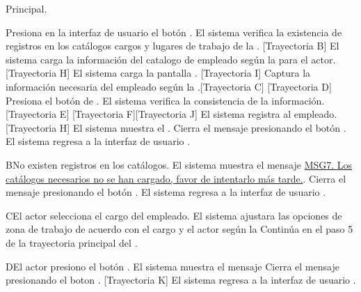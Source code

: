 \begin{UCtrayectoria}{Principal.}
	
	\UCpaso[\UCactor] Presiona en la interfaz de usuario  el botón \IUbutton{+}.
	\UCpaso  El sistema verifica la existencia de registros en los catálogos cargos  y  lugares de trabajo de la  . [Trayectoria B] 
	\UCpaso El sistema carga la información del catalogo de empleado  según la  para el actor. [Trayectoria H]
	\UCpaso El sistema carga la pantalla  . [Trayectoria I]
	\UCpaso[\UCactor] Captura la información necesaria del empleado según la  .[Trayectoria C] [Trayectoria D] 
	\UCpaso[\UCactor]  Presiona el botón de .
	\UCpaso El sistema verifica la consistencia de la información. [Trayectoria E] [Trayectoria F][Trayectoria J]
	\UCpaso El sistema registra al empleado. [Trayectoria H]
	\UCpaso  El sistema muestra el .    
	\UCpaso[\UCactor] Cierra el mensaje presionando el botón .
	\UCpaso El sistema regresa a la interfaz de usuario .
\end{UCtrayectoria}


\begin{UCtrayectoriaA}{B}{No existen registros en los catálogos.}
	\UCpaso El sistema muestra el mensaje \hyperref[MSG7]{MSG7. Los catálogos necesarios no se han cargado, favor de intentarlo más tarde.}.
	\UCpaso[\UCactor] Cierra el mensaje presionando el botón .
	\UCpaso El sistema regresa a la interfaz de usuario .
\end{UCtrayectoriaA}

\begin{UCtrayectoriaA}{C}{El actor selecciona el cargo del empleado.}
	\UCpaso     El sistema ajustara las opciones de zona de trabajo de acuerdo con el cargo y el actor según la 
	\UCpaso Continúa en el paso 5 de la trayectoria principal del .
\end{UCtrayectoriaA}

\begin{UCtrayectoriaA}{D}{El actor presiono el botón .}
	\UCpaso El sistema muestra el mensaje 
	\UCpaso[\UCactor] Cierra el mensaje presionando el boton . [Trayectoria K]
	\UCpaso El sistema regresa a la interfaz de usuario .
\end{UCtrayectoriaA}

